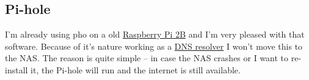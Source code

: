 

\subsection{Pi-hole}\label{subsec:Pi-hole}

I'm already using \gls{pho} on a old \href{https://www.raspberrypi.com/products/raspberry-pi-2-model-b/}{Raspberry Pi 2B}
and I'm very pleased with that software. Because of it's nature working as a
\href{https://en.wikipedia.org/wiki/Domain_Name_System#DNS_resolvers}{DNS resolver}
I won't move this to the NAS. The reason is quite simple -- in case the NAS
crashes or I want to re-install it, the Pi-hole will run and the internet is
still available.
